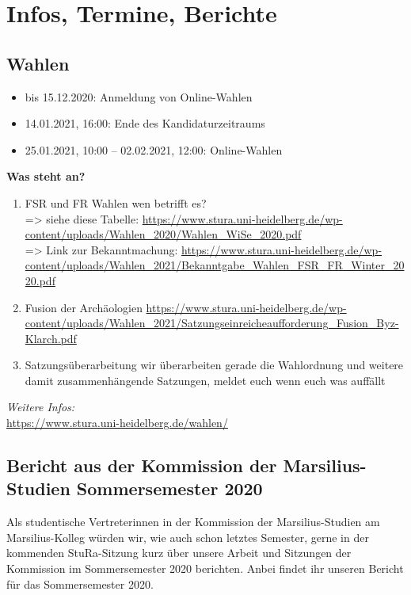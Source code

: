 \section{Infos, Termine, Berichte}
\subsection{Wahlen}
\begin{itemize}
    \item bis 15.12.2020: Anmeldung von Online-Wahlen
    \item 14.01.2021, 16:00: Ende des Kandidaturzeitraums
    \item 25.01.2021, 10:00 – 02.02.2021, 12:00: Online-Wahlen
\end{itemize}
\textbf{Was steht an?}
\begin{enumerate}
    \item FSR und FR Wahlen wen betrifft es?\\
    => siehe diese Tabelle: \url{https://www.stura.uni-heidelberg.de/wp-content/uploads/Wahlen_2020/Wahlen_WiSe_2020.pdf}\\
    => Link zur Bekanntmachung: \url{https://www.stura.uni-heidelberg.de/wp-content/uploads/Wahlen_2021/Bekanntgabe_Wahlen_FSR_FR_Winter_2020.pdf}
    \item Fusion der Archäologien \url{https://www.stura.uni-heidelberg.de/wp-content/uploads/Wahlen_2021/Satzungseinreicheaufforderung_Fusion_Byz-Klarch.pdf}
    \item  Satzungsüberarbeitung wir überarbeiten gerade die Wahlordnung und weitere damit zusammenhängende Satzungen, meldet euch wenn euch was auffällt
\end{enumerate}
\emph{Weitere Infos:}\\
\url{https://www.stura.uni-heidelberg.de/wahlen/}

\subsection{Bericht aus der Kommission der Marsilius-Studien Sommersemester 2020}
Als studentische Vertreterinnen in der Kommission der Marsilius-Studien am Marsilius-Kolleg würden wir, wie auch schon letztes Semester, gerne in der kommenden StuRa-Sitzung kurz über unsere Arbeit und Sitzungen der Kommission im Sommersemester 2020 berichten. Anbei findet ihr unseren Bericht für das Sommersemester 2020.
